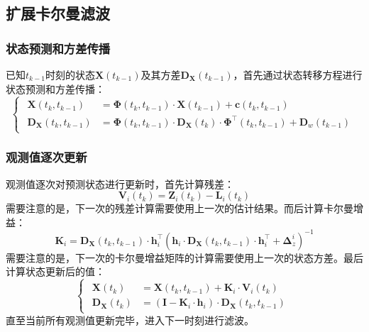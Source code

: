 \documentclass[12pt, onecolumn]{article}
\newcommand\normf{\fangsong}
\begin{document}
	\subsection{\normf 扩展卡尔曼滤波}
	\subsubsection{\normf 状态预测和方差传播}
	已知$t_{k-1}$时刻的状态$\boldsymbol{X}(t_{k-1})$及其方差$\boldsymbol{D}_{\boldsymbol{X}}(t_{k-1})$，首先通过状态转移方程进行状态预测和方差传播：
		\begin{equation}
		\begin{cases}
		\begin{aligned}
		\boldsymbol{X}(t_k,t_{k-1})&=
			\boldsymbol{\Phi}(t_k,t_{k-1})\cdot\boldsymbol{X}(t_{k-1})
			+\boldsymbol{c}(t_k,t_{k-1})
			\\
			\boldsymbol{D}_{\boldsymbol{X}}(t_k,t_{k-1})&=\boldsymbol{\Phi}(t_k,t_{k-1})\cdot\boldsymbol{D}_{\boldsymbol{X}}(t_k)\cdot\boldsymbol{\Phi}^\top(t_k,t_{k-1})+\boldsymbol{D}_{w}(t_{k-1})
		\end{aligned}
		\end{cases}
		\end{equation}
		
	\subsubsection{\normf 观测值逐次更新}
	
	观测值逐次对预测状态进行更新时，首先计算残差：
	\begin{equation}
	\boldsymbol{V}_i(t_k)=\boldsymbol{Z}_i(t_k)-\boldsymbol{L}_i(t_k)
	\end{equation}
	需要注意的是，下一次的残差计算需要使用上一次的估计结果。而后计算卡尔曼增益：
	\begin{equation}
	\boldsymbol{K}_i=\boldsymbol{D}_{\boldsymbol{X}}(t_{k},t_{k-1})\cdot\boldsymbol{h}_i^\top\left( \boldsymbol{h}_i\cdot\boldsymbol{D}_{\boldsymbol{X}}(t_k,t_{k-1})\cdot\boldsymbol{h}_i^\top+\boldsymbol{\Delta}_z^i\right) ^{-1}
	\end{equation}
	需要注意的是，下一次的卡尔曼增益矩阵的计算需要使用上一次的状态方差。最后计算状态更新后的值：
	\begin{equation}
	\begin{cases}
	\begin{aligned}
	\boldsymbol{X}(t_k)&=\boldsymbol{X}(t_k,t_{k-1})+\boldsymbol{K}_i\cdot
		\boldsymbol{V}_i(t_k)
		\\
	\boldsymbol{D}_{\boldsymbol{X}}(t_k)&=\left( \boldsymbol{I}-\boldsymbol{K}_i\cdot\boldsymbol{h}_i\right)\cdot\boldsymbol{D}_{\boldsymbol{X}}(t_k,t_{k-1}) 
	\end{aligned}
	\end{cases}
	\end{equation}
	直至当前所有观测值更新完毕，进入下一时刻进行滤波。
	
\end{document}
